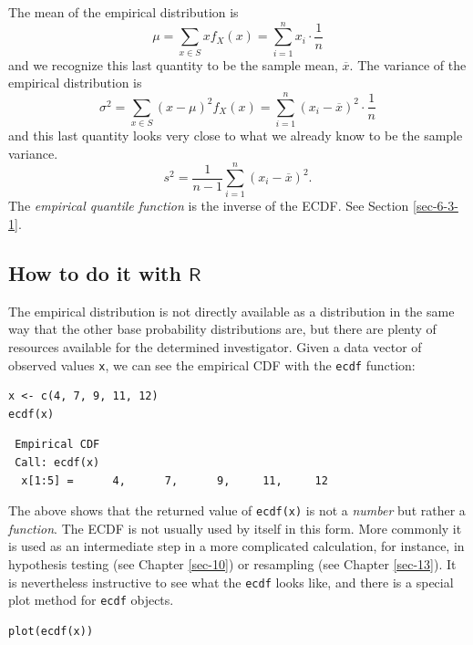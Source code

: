 \documentclass[captions=tableheading]{scrbook}
\begin{document}
The mean of the empirical distribution is
\begin{equation}
\mu=\sum_{x\in S}xf_{X}(x)=\sum_{i=1}^{n}x_{i}\cdot\frac{1}{n}
\end{equation}
and we recognize this last quantity to be the sample mean, \(\overline{x}\). The variance of the empirical distribution is
\begin{equation}
\sigma^{2}=\sum_{x\in S}(x-\mu)^{2}f_{X}(x)=\sum_{i=1}^{n}(x_{i}-\overline{x})^{2}\cdot\frac{1}{n}
\end{equation}
and this last quantity looks very close to what we already know to be the sample variance.
\begin{equation}
s^{2}=\frac{1}{n-1}\sum_{i=1}^{n}(x_{i}-\overline{x})^{2}.
\end{equation}
The \emph{empirical quantile function} is the inverse of the ECDF. See Section \ref{sec-6-3-1}.
\subsection{How to do it with \(\mathsf{R}\)}
\label{sec-5-5-1}


The empirical distribution is not directly available as a distribution in the same way that the other base probability distributions are, but there are plenty of resources available for the determined investigator.  Given a data vector of observed values \texttt{x}, we can see the empirical CDF with the \texttt{ecdf} function:


\lstset{language=R}
\begin{lstlisting}
x <- c(4, 7, 9, 11, 12)
ecdf(x)
\end{lstlisting}

\begin{verbatim}
 Empirical CDF 
 Call: ecdf(x)
  x[1:5] =      4,      7,      9,     11,     12
\end{verbatim}

The above shows that the returned value of \texttt{ecdf(x)} is not a \emph{number} but rather a \emph{function}. The ECDF is not usually used by itself in this form. More commonly it is used as an intermediate step in a more complicated calculation, for instance, in hypothesis testing (see Chapter \ref{sec-10}) or resampling (see Chapter \ref{sec-13}). It is nevertheless instructive to see what the \texttt{ecdf} looks like, and there is a special plot method for \texttt{ecdf} objects.


\lstset{language=R}
\begin{lstlisting}
plot(ecdf(x))
\end{lstlisting}
\end{document}
